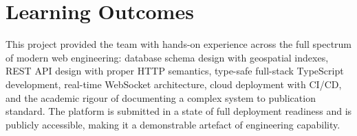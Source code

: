 \documentclass[12pt,a4paper]{report}
\begin{document}
\section{Learning Outcomes}

This project provided the team with hands-on experience across the full spectrum of modern web engineering: database schema design with geospatial indexes, REST API design with proper HTTP semantics, type-safe full-stack TypeScript development, real-time WebSocket architecture, cloud deployment with CI/CD, and the academic rigour of documenting a complex system to publication standard. The platform is submitted in a state of full deployment readiness and is publicly accessible, making it a demonstrable artefact of engineering capability.

\end{document}

